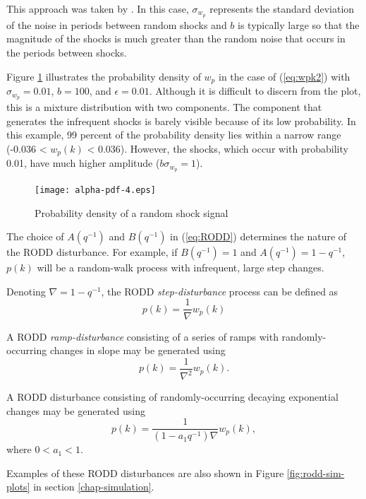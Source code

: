 This approach was taken by \cite{robertson_detection_1995}. In this case, $\sigma_{w_p}$ represents the standard deviation of the noise in periods between random shocks and $b$ is typically large so that the magnitude of the shocks is much greater than the random noise that occurs in the periods between shocks.

Figure \ref{fig:wpk-pdf} illustrates the probability density of $w_p$ in the case of (\ref{eq:wpk2}) with $\sigma_{w_p}=0.01$, $b=100$, and $\epsilon=0.01$. Although it is difficult to discern from the plot, this is a mixture distribution with two components. The component that generates the infrequent shocks is barely visible because of its low probability. In this example, 99 percent of the probability density lies within a narrow range (-0.036 < $w_p(k)$ < 0.036). However, the shocks, which occur with probability 0.01, have much higher amplitude ($b\sigma_{w_p}=1$).

\begin{figure}[htp]
	\centering
	\texttt{[image: alpha-pdf-4.eps]}
	\caption{Probability density of a random shock signal}
	\label{fig:wpk-pdf}
\end{figure}

The choice of $A(q^{-1})$ and $B(q^{-1})$ in (\ref{eq:RODD}) determines the nature of the RODD disturbance. For example, if $B(q^{-1})=1$ and $A(q^{-1})=1-q^{-1}$, $p(k)$ will be a random-walk process with infrequent, large step changes.

Denoting $\nabla=1-q^{-1}$, the RODD \textit{step-disturbance} process can be defined as
\begin{equation} \label{eq:RODD-step}
	p(k)= \frac{1}{\nabla}w_p(k)
\end{equation}

A RODD \textit{ramp-disturbance} consisting of a series of ramps with randomly-occurring changes in slope may be generated using
\begin{equation} \label{eq:RODD-ramp}
	p(k)= \frac{1}{\nabla^2}w_p(k).
\end{equation}

A RODD disturbance consisting of randomly-occurring decaying exponential changes may be generated using
\begin{equation} \label{eq:RODD-exp}
	p(k)= \frac{1}{(1-a_1q^{-1})\nabla}w_p(k),
\end{equation}
where  $0<a_1<1$.

Examples of these RODD disturbances are also shown in Figure \ref{fig:rodd-sim-plots} in section \ref{chap-simulation}.

